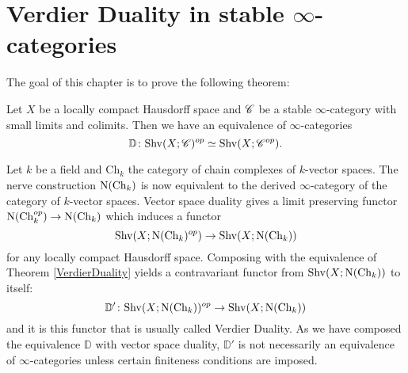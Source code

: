 \documentclass[../../thesis.tex]{subfiles}
\begin{document}
\section{Verdier Duality in stable $\infty$-categories}
The goal of this chapter is to prove the following theorem:
\begin{theorem}\label{VerdierDuality}
    Let $X$ be a locally compact Hausdorff space and $\mathscr{C}$ be a stable $\infty$-category with small limits and colimits.
    Then we have an equivalence of $\infty$-categories
    \[
        \mathbb{D} \colon \mathrm{Shv}(X;\mathscr{C})^{op} \simeq \mathrm{Shv}(X;\mathscr{C}^{op}).
    \]
\end{theorem}
Let $k$ be a field and $\mathrm{Ch}_k$ the category of chain complexes of $k$-vector spaces.
The nerve construction $\mathrm{N}(\mathrm{Ch}_k)$ is now equivalent to the derived $\infty$-category of the category of $k$-vector spaces.
Vector space duality gives a limit preserving functor $\mathrm{N}(\mathrm{Ch}_k^{op}) \to \mathrm{N}(\mathrm{Ch}_k)$ which induces a functor
\[
    \mathrm{Shv}(X;\mathrm{N}(\mathrm{Ch}_k)^{op}) \to \mathrm{Shv}(X;\mathrm{N}(\mathrm{Ch}_k))
\]
for any locally compact Hausdorff space.
Composing with the equivalence of Theorem \ref{VerdierDuality} yields a contravariant functor from $\mathrm{Shv}(X;\mathrm{N}(\mathrm{Ch}_k))$ to itself:
\[
    \mathbb{D}'\colon \mathrm{Shv}(X;\mathrm{N}(\mathrm{Ch}_k))^{op} \to \mathrm{Shv}(X;\mathrm{N}(\mathrm{Ch}_k))
\]
and it is this functor that is usually called Verdier Duality. As we have composed the equivalence $\mathbb{D}$ with vector space duality, $\mathbb{D}'$ is not necessarily an equivalence of $\infty$-categories unless certain finiteness conditions are imposed.
\end{document}
